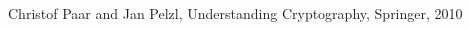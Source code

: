 \begin{thebibliography}{99.}

 Christof Paar and Jan Pelzl, Understanding Cryptography,
Springer, 2010

\end{thebibliography}
